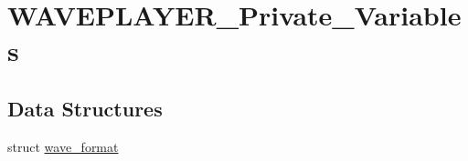 \hypertarget{group___w_a_v_e_p_l_a_y_e_r___private___variables}{\section{\-W\-A\-V\-E\-P\-L\-A\-Y\-E\-R\-\_\-\-Private\-\_\-\-Variables}
\label{group___w_a_v_e_p_l_a_y_e_r___private___variables}
}
\subsection*{\-Data \-Structures}
\begin{DoxyCompactItemize}
\item 
struct \hyperlink{structwave__format}{wave\-\_\-format}
\end{DoxyCompactItemize}
